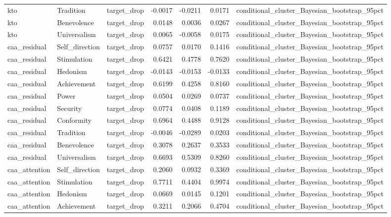 \begin{tabular}{lllrrrl}
kto & Tradition & target\_drop & -0.0017 & -0.0211 & 0.0171 & conditional\_cluster\_Bayesian\_bootstrap\_95pct \\
kto & Benevolence & target\_drop & 0.0148 & 0.0036 & 0.0267 & conditional\_cluster\_Bayesian\_bootstrap\_95pct \\
kto & Universalism & target\_drop & 0.0065 & -0.0058 & 0.0175 & conditional\_cluster\_Bayesian\_bootstrap\_95pct \\
caa\_residual & Self\_direction & target\_drop & 0.0757 & 0.0170 & 0.1416 & conditional\_cluster\_Bayesian\_bootstrap\_95pct \\
caa\_residual & Stimulation & target\_drop & 0.6421 & 0.4778 & 0.7620 & conditional\_cluster\_Bayesian\_bootstrap\_95pct \\
caa\_residual & Hedonism & target\_drop & -0.0143 & -0.0153 & -0.0133 & conditional\_cluster\_Bayesian\_bootstrap\_95pct \\
caa\_residual & Achievement & target\_drop & 0.6199 & 0.4258 & 0.8160 & conditional\_cluster\_Bayesian\_bootstrap\_95pct \\
caa\_residual & Power & target\_drop & 0.0504 & 0.0269 & 0.0737 & conditional\_cluster\_Bayesian\_bootstrap\_95pct \\
caa\_residual & Security & target\_drop & 0.0774 & 0.0408 & 0.1189 & conditional\_cluster\_Bayesian\_bootstrap\_95pct \\
caa\_residual & Conformity & target\_drop & 0.6964 & 0.4488 & 0.9128 & conditional\_cluster\_Bayesian\_bootstrap\_95pct \\
caa\_residual & Tradition & target\_drop & -0.0046 & -0.0289 & 0.0203 & conditional\_cluster\_Bayesian\_bootstrap\_95pct \\
caa\_residual & Benevolence & target\_drop & 0.3078 & 0.2637 & 0.3533 & conditional\_cluster\_Bayesian\_bootstrap\_95pct \\
caa\_residual & Universalism & target\_drop & 0.6693 & 0.5309 & 0.8260 & conditional\_cluster\_Bayesian\_bootstrap\_95pct \\
caa\_attention & Self\_direction & target\_drop & 0.2060 & 0.0932 & 0.3369 & conditional\_cluster\_Bayesian\_bootstrap\_95pct \\
caa\_attention & Stimulation & target\_drop & 0.7711 & 0.4404 & 0.9974 & conditional\_cluster\_Bayesian\_bootstrap\_95pct \\
caa\_attention & Hedonism & target\_drop & 0.0669 & 0.0145 & 0.1201 & conditional\_cluster\_Bayesian\_bootstrap\_95pct \\
caa\_attention & Achievement & target\_drop & 0.3211 & 0.2066 & 0.4704 & conditional\_cluster\_Bayesian\_bootstrap\_95pct \\

\end{tabular}
